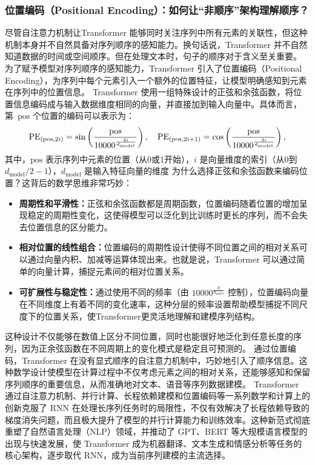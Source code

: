   \subsubsection*{位置编码（Positional Encoding）：如何让“非顺序”架构理解顺序？}
尽管自注意力机制让Transformer 能够同时关注序列中所有元素的关联性，但这种机制本身并不自然具备对序列顺序的感知能力。换句话说，Transformer 并不自然知道数据的时间或空间顺序。但在处理文本时，句子的顺序对于含义至关重要。
为了赋予模型对序列顺序的感知能力，Transformer 引入了位置编码（Positional Encoding），为序列中每个元素引入一个额外的位置特征，让模型明确感知到元素在序列中的位置信息。
Transformer 使用一组特殊设计的正弦和余弦函数，将位置信息编码成与输入数据维度相同的向量，并直接加到输入向量中。具体而言，第~$\text{pos}$ 个位置的编码可以表示为：
$$
\text{PE}_{({\rm pos},2i)} = {\rm sin}\left(  \frac{{\rm pos}}{10000^{\frac{2i}{d_{\rm model}}}}\right), \quad \text{PE}_{({\rm pos},2i+1)} = {\rm cos}\left(  \frac{{\rm pos}}{10000^{\frac{2i}{d_{\rm model}}}}\right),
$$
其中，$\text{pos}$ 表示序列中元素的位置（从0或1开始），$i$ 是向量维度的索引（从0到$d_{\text{model}}/2-1$），$d_{\text{model}}$ 是输入特征向量的维度
为什么选择正弦和余弦函数来编码位置？这背后的数学思维非常巧妙：
\begin{itemize}
\item {\bf  周期性和平滑性：}正弦和余弦函数都是周期函数，位置编码随着位置的增加呈现稳定的周期性变化，这使得模型可以泛化到比训练时更长的序列，而不会失去位置信息的区分能力。
\item {\bf  相对位置的线性组合：}位置编码的周期性设计使得不同位置之间的相对关系可以通过向量内积、加减等运算体现出来。也就是说，Transformer 可以通过简单的向量计算，捕捉元素间的相对位置关系。
\item {\bf  可扩展性与稳定性：}通过使用不同的频率（由 $10000^{\frac{2i}{d_{\text{model}}}}$ 控制），位置编码向量在不同维度上有着不同的变化速率，这种分层的频率设置帮助模型捕捉不同尺度下的位置关系，使Transformer更灵活地理解和建模序列结构。
\end{itemize}
这种设计不仅能够在数值上区分不同位置，同时也能很好地泛化到任意长度的序列，因为正余弦函数在不同周期上的变化模式是稳定且可预测的。
通过位置编码，Transformer 在没有显式顺序的自注意力机制中，巧妙地引入了顺序信息。这种数学设计使模型在计算过程中不仅考虑元素之间的相对关系，还能够感知和保留序列顺序的重要信息，从而准确地对文本、语音等序列数据建模。
Transformer 通过自注意力机制、并行计算、长程依赖建模和位置编码等一系列数学和计算上的创新克服了 RNN 在处理长序列任务时的局限性，不仅有效解决了长程依赖导致的梯度消失问题，而且极大提升了模型的并行计算能力和训练效率。这种新范式彻底重塑了自然语言处理（NLP）领域，并推动了 GPT、BERT 等大规模语言模型的出现与快速发展，使 Transformer 成为机器翻译、文本生成和情感分析等任务的核心架构，逐步取代 RNN，成为当前序列建模的主流选择。
